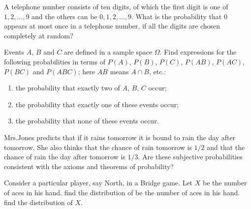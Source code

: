 \begin{problem}
  A telephone number consists of ten digits, of which the first digit is
  one of \(1,2,\dotsc,9\) and the others can be \(0,1,2,\dotsc,9\). What is
  the probability that \(0\) appears at most once in a telephone number, if
  all the digits are chosen completely at random?
\end{problem}
\begin{solution}

\end{solution}
\newpage

\begin{problem}
  Events \(A\), \(B\) and \(C\) are defined in a sample space
  \(\Omega\). Find expressions for the following probabilities in terms of
  \(P(A)\), \(P(B)\), \(P(C)\), \(P(AB)\), \(P(AC)\), \(P(BC)\) and
  \(P(ABC)\); here \(AB\) means \(A\cap B\), etc.:
  \begin{enumerate}[label=(\alph*)]
  \item the probability that exactly two of \(A\), \(B\), \(C\) occur;
  \item the probability that exactly one of these events occur;
  \item the probability that none of these events occur.
  \end{enumerate}
\end{problem}
\begin{solution}

\end{solution}
\newpage

\begin{problem}
  Mrs.\@ Jones predicts that if it rains tomorrow it is bound to rain the
  day after tomorrow. She also thinks that the chance of rain tomorrow is
  \(1/2\) and that the chance of rain the day after tomorrow is
  \(1/3\). Are these subjective probabilities consistent with the axioms
  and theorems of probability?
\end{problem}
\begin{solution}

\end{solution}
\newpage

\begin{problem}[Handout 1, \# 16]
  Consider a particular player, say North, in a Bridge game. Let \(X\) be
  the number of aces in his hand. find the distribution of be the number of
  aces in his hand. find the distribution of \(X\).
\end{problem}
\begin{solution}

\end{solution}
\newpage

